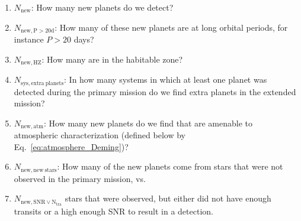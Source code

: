 \begin{enumerate}
	\item $N_\mathrm{new}$: How many new planets do we detect?
	\item $N_\mathrm{new,P>20d}$: How many of these new planets are at long orbital periods, for instance $P>20$ days?
	\item $N_\mathrm{new,HZ}$: How many are in the habitable zone?
	\item $N_\mathrm{sys,extra\ planets}$: In how many systems in which at least one planet was detected during the primary mission do we find extra planets in the extended mission?
	\item $N_\mathrm{new,atm}$: How many new planets do we find that are amenable to atmospheric characterization (defined below by Eq.~\ref{eq:atmosphere_Deming})?
	\item $N_\mathrm{new,new\ stars}$: How many of the new planets come from stars that were not observed in the primary mission, vs. 
	\item $N_\mathrm{new,SNR\lor N_{tra}}$ stars that were observed, but either did not have enough transits or a high enough SNR to result in a detection.
\end{enumerate}
